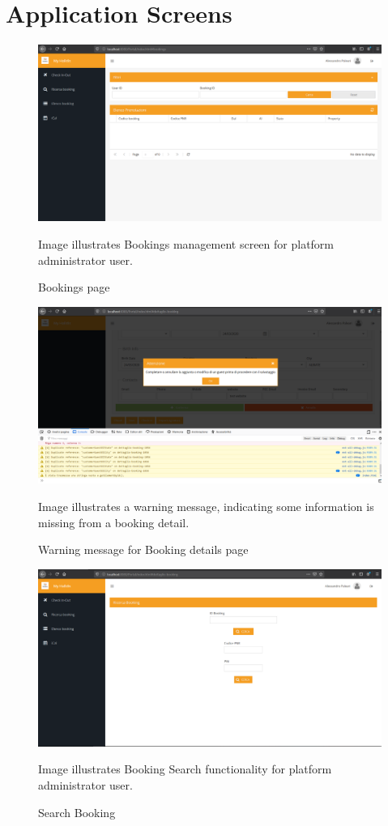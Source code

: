 \chapter{Application Screens}
\label{my_appendix}
\thispagestyle{plain}

\begin{figure} 
\centering
\includegraphics[width=12cm]{pictures/screens/bookings-platform-admin.png}
\caption{Bookings page}
Image illustrates Bookings management screen for platform administrator user.
\label{fig:bookings_platform_admin_pic}
\end{figure}


\begin{figure} 
\centering
\includegraphics[width=12cm]{pictures/screens/booking-detail-warning.png}
\caption{Warning message for Booking details page}
Image illustrates a warning message, indicating some information is missing from a booking detail.
\label{fig:booking_detail_warning_pic}
\end{figure}

\begin{figure} 
\centering
\includegraphics[width=12cm]{pictures/screens/search-booking-platform-admin.png}
\caption{Search Booking}
Image illustrates Booking Search functionality for platform administrator user. 
\label{fig:search_booking_platform_admin_pic}
\end{figure}

